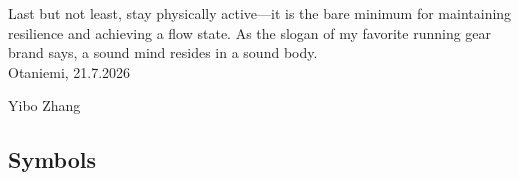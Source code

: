 \documentclass[english,12pt,a4paper,pdftex,elec,utf8]{aaltothesis}
\begin{document}
Last but not least, stay physically active—it is the bare minimum for maintaining resilience and achieving a flow state. As the slogan of my favorite running gear brand says, a sound mind resides in a sound body.
\\

\vspace{5cm}
Otaniemi, 21.7.2026

\vspace{5mm}
{\hfill Yibo Zhang \hspace{1cm}}

\newpage


\thesistableofcontents



\subsection*{Symbols}
\end{document}
